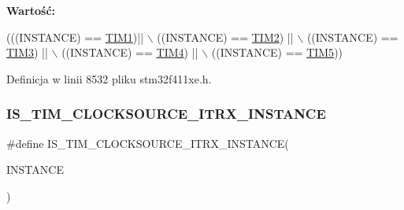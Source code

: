 {\bfseries Wartość\+:}
\begin{DoxyCode}
(((INSTANCE) == \hyperlink{group___peripheral__declaration_ga2e87451fea8dc9380056d3cfc5ed81fb}{TIM1})|| \(\backslash\)
                                                        ((INSTANCE) == \hyperlink{group___peripheral__declaration_ga3cfac9f2e43673f790f8668d48b4b92b}{TIM2}) || \(\backslash\)
                                                        ((INSTANCE) == \hyperlink{group___peripheral__declaration_ga61ee4c391385607d7af432b63905fcc9}{TIM3}) || \(\backslash\)
                                                        ((INSTANCE) == \hyperlink{group___peripheral__declaration_ga91a09bad8bdc7a1cb3d85cf49c94c8ec}{TIM4}) || \(\backslash\)
                                                        ((INSTANCE) == \hyperlink{group___peripheral__declaration_ga5125ff6a23a2ed66e2e19bd196128c14}{TIM5}))
\end{DoxyCode}


Definicja w linii 8532 pliku stm32f411xe.\+h.

\mbox{\label{group___exported__macros_ga57882c3c75fddf0ccf0c6ecf99b3d3df}} 
\subsubsection{\texorpdfstring{I\+S\+\_\+\+T\+I\+M\+\_\+\+C\+L\+O\+C\+K\+S\+O\+U\+R\+C\+E\+\_\+\+I\+T\+R\+X\+\_\+\+I\+N\+S\+T\+A\+N\+CE}{IS\_TIM\_CLOCKSOURCE\_ITRX\_INSTANCE}}
{\footnotesize\ttfamily \#define I\+S\+\_\+\+T\+I\+M\+\_\+\+C\+L\+O\+C\+K\+S\+O\+U\+R\+C\+E\+\_\+\+I\+T\+R\+X\+\_\+\+I\+N\+S\+T\+A\+N\+CE(\begin{DoxyParamCaption}\item[{}]{I\+N\+S\+T\+A\+N\+CE }\end{DoxyParamCaption})}

